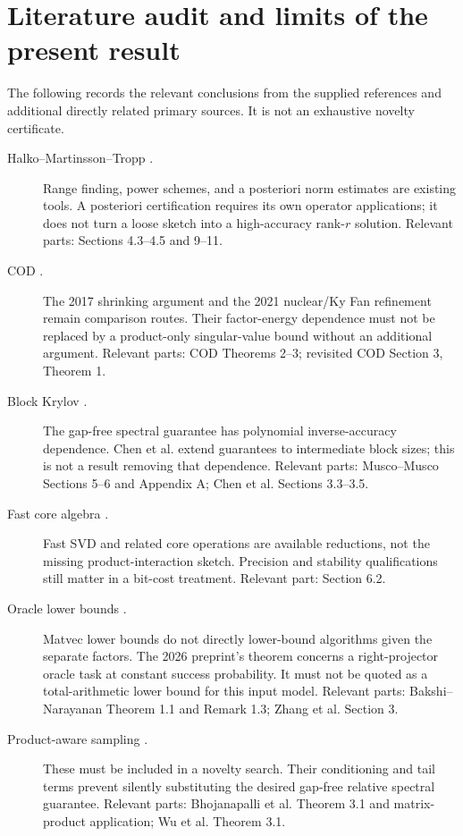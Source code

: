 \documentclass[11pt]{article}
\theoremstyle{remark}
\begin{document}
\section{Literature audit and limits of the present result}
The following records the relevant conclusions from the supplied references
and additional directly related primary sources. It is not an exhaustive
novelty certificate.
\begin{description}
 \item[Halko--Martinsson--Tropp \cite{hmt}.]
 Range finding, power schemes, and a posteriori norm estimates are existing
 tools. A posteriori certification requires its own operator applications;
 it does not turn a loose sketch into a high-accuracy rank-\(r\) solution.
 Relevant parts: Sections 4.3--4.5 and 9--11.
 \item[COD \cite{cod,luo}.]
 The 2017 shrinking argument and the 2021 nuclear/Ky Fan refinement remain
 comparison routes. Their factor-energy dependence must not be replaced by
 a product-only singular-value bound without an additional argument.
 Relevant parts: COD Theorems 2--3; revisited COD Section 3, Theorem 1.
 \item[Block Krylov \cite{musco,chen}.]
 The gap-free spectral guarantee has polynomial inverse-accuracy dependence.
 Chen et al. extend guarantees to intermediate block sizes; this is not a
 result removing that dependence. Relevant parts: Musco--Musco Sections 5--6
 and Appendix A; Chen et al. Sections 3.3--3.5.
 \item[Fast core algebra \cite{demmel}.]
 Fast SVD and related core operations are available reductions, not the
 missing product-interaction sketch. Precision and stability qualifications
 still matter in a bit-cost treatment. Relevant part: Section 6.2.
 \item[Oracle lower bounds \cite{bakshi,zhang}.]
 Matvec lower bounds do not directly lower-bound algorithms given the
 separate factors. The 2026 preprint's theorem concerns a right-projector
 oracle task at constant success probability. It must not be quoted as a
 total-arithmetic lower bound for this input model. Relevant parts:
 Bakshi--Narayanan Theorem 1.1 and Remark 1.3; Zhang et al. Section 3.
 \item[Product-aware sampling \cite{bhojanapalli,wu}.]
 These must be included in a novelty search. Their conditioning and tail
 terms prevent silently substituting the desired gap-free relative spectral
 guarantee. Relevant parts: Bhojanapalli et al. Theorem 3.1 and matrix-product
 application; Wu et al. Theorem 3.1.

\end{description}
\end{document}
